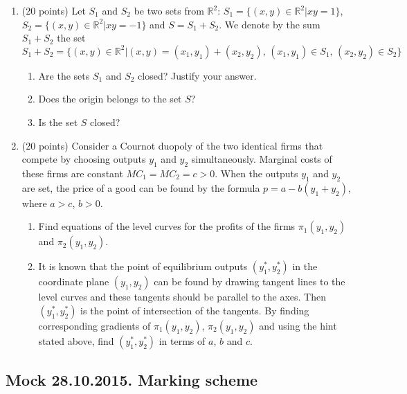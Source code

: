 \documentclass[12pt]{article} %
\theoremstyle{definition} %
\def \RR{\mathbb{R}}
\begin{document}
\begin{enumerate}[resume]


\item (20 points) Let $S_1$ and $S_2$ be two sets from $\RR^2$: $S_1=\{(x,y) \in \RR^2 | xy=1 \}$, $S_2=\{(x,y) \in \RR^2 | xy=-1 \}$ and $S=S_1+S_2$. We denote by the sum $S_1+S_2$ the set
\[
S_1+S_2=\{ (x,y) \in \RR^2 | (x,y)=(x_1,y_1)+(x_2,y_2), \, (x_1,y_1) \in S_1, \, (x_2,y_2) \in S_2 \}
\]
\begin{enumerate}
\item Are the sets $S_1$ and $S_2$ closed? Justify your answer.
\item Does the origin belongs to the set $S$? %
\item Is the set $S$ closed? %
\end{enumerate}
\item (20 points) Consider a Cournot duopoly of the two identical firms that compete by choosing outputs $y_1$  and $y_2$  simultaneously. Marginal costs of these firms are constant $MC_1=MC_2=c>0$. When the outputs $y_1$  and $y_2$ are set, the price of a good can be found by the formula  $p=a-b(y_1+y_2)$, where  $a>c$, $b>0$.
\begin{enumerate}
\item Find equations of the level curves for the profits of the firms $\pi_1(y_1, y_2)$ and  $\pi_2(y_1, y_2)$.
\item It is known that the point of equilibrium outputs $(y_1^*, y_2^*)$  in the coordinate plane $(y_1, y_2)$ can be found by drawing tangent lines to the level curves and these tangents should be parallel to the axes.
Then $(y_1^*, y_2^*)$ is the point of intersection of the tangents.
By finding corresponding gradients of $\pi_1(y_1, y_2)$,  $\pi_2(y_1, y_2)$ and using the hint stated above, find    $(y_1^*, y_2^*)$ in terms of $a$, $b$ and $c$.
\end{enumerate}

\end{enumerate}


\subsection{Mock 28.10.2015. Marking scheme}
\end{document}
